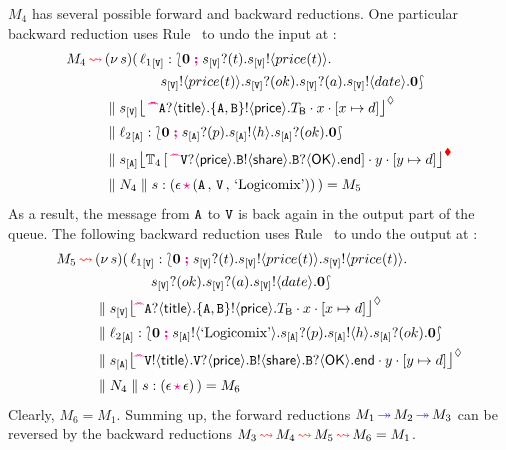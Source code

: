 \documentclass[runningheads,plain]{llncs}
\begin{document}
$M_4$ has several possible forward and backward reductions. 
One particular backward reduction 
uses Rule~ to 
undo the input at \pS:
\begin{align*}
M_4  \bk  & \news{s}(\,  
\np{\key{{\loc_1}}{\pS}}{ \conf{\inact}{\binp{\epS}{t}\bout{\epS}{price(t)} \\
& \qquad \qquad \bout{\epS}{price(t)}   \binp{\epS}{ok}\binp{\epS}{a} \bout{\epS}{date}\inact }} 
\\
& \Par 
 \hmoni{\ep{s}{\pS}}{\past \ltinp{A}{\mathsf{title}}{\ltout{\{A,B\}}{\mathsf{price}}{T_\mathsf{B}}}}{x}{\upd{x}{d}} 
\\
& \Par \np{\key{{\loc_2}}{\pA}}{ \conf{\inact}{\binp{\epA}{p}\bout{\epA}{h}\binp{\epA}{ok}\inact}} 
\\
& \Par 
\monir{\ep{s}{\pA}}{\myctxr{\ctx{T}_4}{\past \ltinp{\pS}{\mathsf{price}}{\ltout{B}{\mathsf{share}}{\ltinp{B}{\mathsf{OK}}{\lend}}}}}{y}{\upd{y}{d}} 
\\
& \Par N_4 \Par \codah{s}{\emp}{\valueq{\pA}{\pS}{\exBook}}{}~)  = M_5
\end{align*}
As a result, the message from $\mathtt{A}$ to $\mathtt{V}$ is back again in the output part of the queue.
The following backward reduction %
uses Rule~
to undo the output at \pA:
\begin{align*}
M_5  \bk & \news{s}(\,  
\np{\key{{\loc_1}}{\pS}}{ \conf{\inact}{\binp{\epS}{t}\bout{\epS}{price(t)}\bout{\epS}{price(t)} \\ 
& \qquad \qquad  \binp{\epS}{ok}\binp{\epS}{a} \bout{\epS}{date}\inact }} 
\\
& \Par 
\hmoni{\ep{s}{\pS}}{\!\!\past \ltinp{A}{\mathsf{title}}{\ltout{\{A,B\}}{\mathsf{price}}{T_\mathsf{B}}}}{x}{\upd{x}{d}} 
\\
&  \Par \np{\key{{\loc_2}}{\pA}}{ \conf{\inact}{\bout{\epA}{\exBook}\binp{\epA}{p}\bout{\epA}{h}\binp{\epA}{ok}\inact}} 
\\
&  \Par 
\hmoni{\ep{s}{\pA}}{\!\!\past \ltout{\pS}{\mathsf{title}}{\ltinp{\pS}{\mathsf{price}}{\ltout{B}{\mathsf{share}}{\ltinp{B}{\mathsf{OK}}{\lend}}}}}{y}{\upd{y}{d}} 
\\
&  
\Par N_4 \Par \codah{s}{\emp}{\emp}{}~)  = M_6
\end{align*}
Clearly, $M_6 = M_1$.
Summing up, the forward reductions
$M_1 \textcolor{blue}{\,\twoheadrightarrow\,} M_2 \textcolor{blue}{\,\twoheadrightarrow\,} M_3$ can be reversed by the backward reductions
$M_3 \textcolor{red}{\,\rightsquigarrow\,} M_4 \textcolor{red}{\,\rightsquigarrow\,} M_5 \textcolor{red}{\,\rightsquigarrow\,} M_6 = M_1$.
\end{document}
